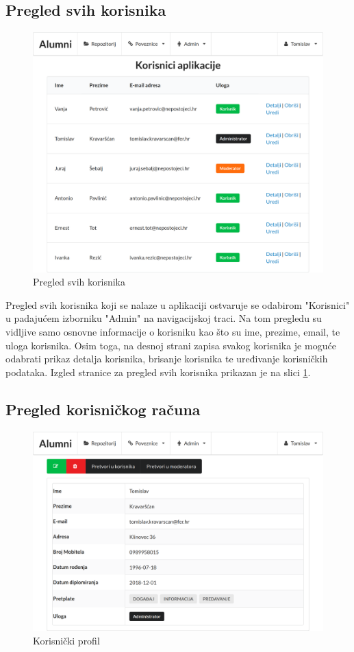 \documentclass[zavrsni, numeric]{fer}
\begin{document}
\subsection{Pregled svih korisnika}

\begin{figure}[H]
	\centering
	\includegraphics[width=13cm]{slike/korisnici.png}
	\caption{Pregled svih korisnika}
	\label{fig:korisnici}
\end{figure}

Pregled svih korisnika koji se nalaze u aplikaciji ostvaruje se odabirom "Korisnici" u padajućem izborniku "Admin" na navigacijskoj traci. Na tom pregledu su vidljive samo osnovne informacije o korisniku kao što su ime, prezime, email, te uloga korisnika. Osim toga, na desnoj strani zapisa svakog korisnika je moguće odabrati prikaz detalja korisnika, brisanje korisnika te uređivanje korisničkih podataka. Izgled stranice za pregled svih korisnika prikazan je na slici \ref{fig:korisnici}.

\subsection{Pregled korisničkog računa}

\begin{figure}[H]
	\centering
	\includegraphics[width=13cm]{slike/profil.png}
	\caption{Korisnički profil}
	\label{fig:profil}
\end{figure}
\end{document}

